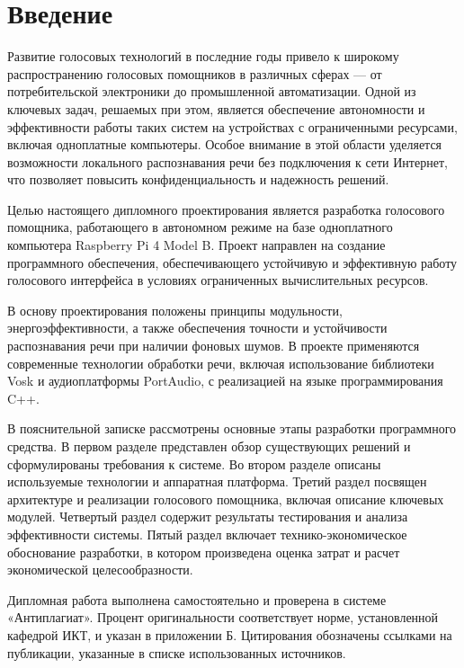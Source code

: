 
\section*{Введение}


Развитие голосовых технологий в последние годы привело к широкому распространению голосовых помощников в различных сферах — от потребительской электроники до промышленной автоматизации. Одной из ключевых задач, решаемых при этом, является обеспечение автономности и эффективности работы таких систем на устройствах с ограниченными ресурсами, включая одноплатные компьютеры. Особое внимание в этой области уделяется возможности локального распознавания речи без подключения к сети Интернет, что позволяет повысить конфиденциальность и надежность решений.

Целью настоящего дипломного проектирования является разработка голосового помощника, работающего в автономном режиме на базе одноплатного компьютера Raspberry Pi 4 Model B. Проект направлен на создание программного обеспечения, обеспечивающего устойчивую и эффективную работу голосового интерфейса в условиях ограниченных вычислительных ресурсов.

В основу проектирования положены принципы модульности, энергоэффективности, а также обеспечения точности и устойчивости распознавания речи при наличии фоновых шумов. В проекте применяются современные технологии обработки речи, включая использование библиотеки Vosk и аудиоплатформы PortAudio, с реализацией на языке программирования C++.

В пояснительной записке рассмотрены основные этапы разработки программного средства. В первом разделе представлен обзор существующих решений и сформулированы требования к системе. Во втором разделе описаны используемые технологии и аппаратная платформа. Третий раздел посвящен архитектуре и реализации голосового помощника, включая описание ключевых модулей. Четвертый раздел содержит результаты тестирования и анализа эффективности системы. Пятый раздел включает технико-экономическое обоснование разработки, в котором произведена оценка затрат и расчет экономической целесообразности.

Дипломная работа выполнена самостоятельно и проверена в системе «Антиплагиат». Процент оригинальности соответствует норме, установленной кафедрой ИКТ, и указан в приложении Б. Цитирования обозначены ссылками на публикации, указанные в списке использованных источников.

\newpage
